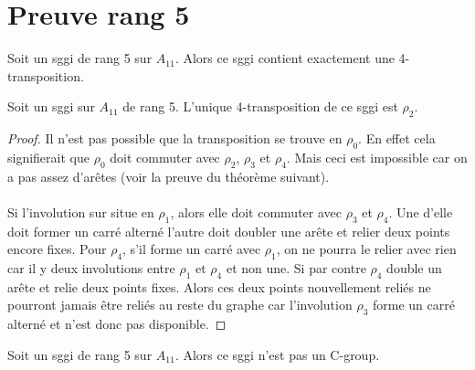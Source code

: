 \section{Preuve rang 5}

\begin{theorem}
  Soit un sggi de rang 5 sur $A_{11}$. Alors ce sggi contient exactement une 4-transposition.
\end{theorem}

\begin{theorem}
  Soit un sggi sur $A_{11}$ de rang 5. L'unique 4-transposition de ce sggi est $\rho_2$.
\end{theorem}

\begin{proof}
  Il n'est pas possible que la transposition se trouve en $\rho_0$. En effet cela signifierait que $\rho_0$ doit commuter avec $\rho_2$, $\rho_3$ et $\rho_4$. Mais ceci est impossible car on a pas assez d'arêtes (voir la preuve du théorème suivant).

  \paragraph{}
  Si l'involution sur situe en $\rho_1$, alors elle doit commuter avec $\rho_3$ et $\rho_4$. Une d'elle doit former un carré alterné l'autre doit doubler une arête et relier deux points encore fixes. Pour $\rho_4$, s'il forme un carré avec $\rho_1$, on ne pourra le relier avec rien car il y deux involutions entre $\rho_1$ et $\rho_4$ et non une. Si par contre $\rho_4$ double un arête et relie deux points fixes. Alors ces deux points nouvellement reliés ne pourront jamais être reliés au reste du graphe car l'involution $\rho_3$ forme un carré alterné et n'est donc pas disponible.
\end{proof}

\begin{theorem}
  Soit un sggi de rang 5 sur $A_{11}$. Alors ce sggi n'est pas un C-group.
\end{theorem}


